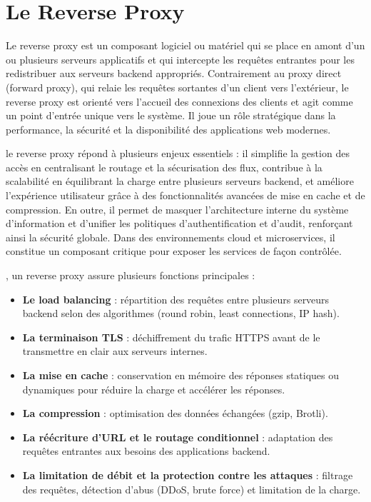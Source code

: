 \section{Le Reverse Proxy}

Le reverse proxy est un composant logiciel ou matériel qui se place en amont d’un ou plusieurs serveurs applicatifs et qui intercepte les requêtes entrantes pour les redistribuer aux serveurs backend appropriés. Contrairement au proxy direct (forward proxy), qui relaie les requêtes sortantes d’un client vers l’extérieur, le reverse proxy est orienté vers l’accueil des connexions des clients et agit comme un point d’entrée unique vers le système. Il joue un rôle stratégique dans la performance, la sécurité et la disponibilité des applications web modernes.

le reverse proxy répond à plusieurs enjeux essentiels  : il simplifie la gestion des accès en centralisant le routage et la sécurisation des flux, contribue à la scalabilité en équilibrant la charge entre plusieurs serveurs backend, et améliore l’expérience utilisateur grâce à des fonctionnalités avancées de mise en cache et de compression. En outre, il permet de masquer l’architecture interne du système d’information et d’unifier les politiques d’authentification et d’audit, renforçant ainsi la sécurité globale. Dans des environnements cloud et microservices, il constitue un composant critique pour exposer les services de façon contrôlée.

, un reverse proxy assure plusieurs fonctions principales :
\begin{itemize}
	\item \textbf{Le load balancing}  : répartition des requêtes entre plusieurs serveurs backend selon des algorithmes (round robin, least connections, IP hash).
	\item \textbf{La terminaison TLS}  : déchiffrement du trafic HTTPS avant de le transmettre en clair aux serveurs internes.
	\item \textbf{La mise en cache}  : conservation en mémoire des réponses statiques ou dynamiques pour réduire la charge et accélérer les réponses.
	\item \textbf{La compression}  : optimisation des données échangées (gzip, Brotli).
	\item \textbf{La réécriture d’URL et le routage conditionnel}  : adaptation des requêtes entrantes aux besoins des applications backend.
	\item \textbf{La limitation de débit et la protection contre les attaques}  : filtrage des requêtes, détection d’abus (DDoS, brute force) et limitation de la charge.
\end{itemize}

